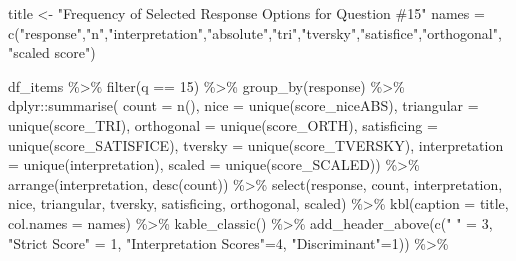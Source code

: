 \documentclass[
  letterpaper,
  DIV=11,
  numbers=noendperiod]{scrreprt}
\newenvironment{Shaded}{\begin{snugshade}}{\end{snugshade}}
\newcommand{\AttributeTok}[1]{\textcolor[rgb]{0.40,0.45,0.13}{#1}}
\newcommand{\DecValTok}[1]{\textcolor[rgb]{0.68,0.00,0.00}{#1}}
\newcommand{\FunctionTok}[1]{\textcolor[rgb]{0.28,0.35,0.67}{#1}}
\newcommand{\NormalTok}[1]{\textcolor[rgb]{0.00,0.23,0.31}{#1}}
\newcommand{\OtherTok}[1]{\textcolor[rgb]{0.00,0.23,0.31}{#1}}
\newcommand{\SpecialCharTok}[1]{\textcolor[rgb]{0.37,0.37,0.37}{#1}}
\newcommand{\StringTok}[1]{\textcolor[rgb]{0.13,0.47,0.30}{#1}}
\begin{document}
\begin{Shaded}
\begin{Highlighting}[]
\NormalTok{title }\OtherTok{\textless{}{-}} \StringTok{"Frequency of Selected Response Options for Question \#15"}
\NormalTok{names }\OtherTok{=} \FunctionTok{c}\NormalTok{(}\StringTok{"response"}\NormalTok{,}\StringTok{"n"}\NormalTok{,}\StringTok{"interpretation"}\NormalTok{,}\StringTok{"absolute"}\NormalTok{,}\StringTok{"tri"}\NormalTok{,}\StringTok{"tversky"}\NormalTok{,}\StringTok{"satisfice"}\NormalTok{,}\StringTok{"orthogonal"}\NormalTok{, }\StringTok{"scaled score"}\NormalTok{)}

\NormalTok{df\_items }\SpecialCharTok{\%\textgreater{}\%} \FunctionTok{filter}\NormalTok{(q }\SpecialCharTok{==} \DecValTok{15}\NormalTok{) }\SpecialCharTok{\%\textgreater{}\%} \FunctionTok{group\_by}\NormalTok{(response) }\SpecialCharTok{\%\textgreater{}\%}
\NormalTok{  dplyr}\SpecialCharTok{::}\FunctionTok{summarise}\NormalTok{( }\AttributeTok{count =} \FunctionTok{n}\NormalTok{(),}
                    \AttributeTok{nice =} \FunctionTok{unique}\NormalTok{(score\_niceABS),}
                    \AttributeTok{triangular =} \FunctionTok{unique}\NormalTok{(score\_TRI),}
                    \AttributeTok{orthogonal =}  \FunctionTok{unique}\NormalTok{(score\_ORTH),}
                    \AttributeTok{satisficing =}  \FunctionTok{unique}\NormalTok{(score\_SATISFICE),}
                    \AttributeTok{tversky =} \FunctionTok{unique}\NormalTok{(score\_TVERSKY),}
                    \AttributeTok{interpretation =} \FunctionTok{unique}\NormalTok{(interpretation),}
                    \AttributeTok{scaled =} \FunctionTok{unique}\NormalTok{(score\_SCALED)) }\SpecialCharTok{\%\textgreater{}\%}
  \FunctionTok{arrange}\NormalTok{(interpretation, }\FunctionTok{desc}\NormalTok{(count)) }\SpecialCharTok{\%\textgreater{}\%}
  \FunctionTok{select}\NormalTok{(response, count, interpretation, nice,}
\NormalTok{         triangular, tversky, satisficing, orthogonal, scaled) }\SpecialCharTok{\%\textgreater{}\%}
  \FunctionTok{kbl}\NormalTok{(}\AttributeTok{caption =}\NormalTok{ title, }\AttributeTok{col.names =}\NormalTok{ names) }\SpecialCharTok{\%\textgreater{}\%}  \FunctionTok{kable\_classic}\NormalTok{() }\SpecialCharTok{\%\textgreater{}\%}
  \FunctionTok{add\_header\_above}\NormalTok{(}\FunctionTok{c}\NormalTok{(}\StringTok{" "} \OtherTok{=} \DecValTok{3}\NormalTok{, }\StringTok{"Strict Score"} \OtherTok{=} \DecValTok{1}\NormalTok{, }\StringTok{"Interpretation Scores"}\OtherTok{=}\DecValTok{4}\NormalTok{, }\StringTok{"Discriminant"}\OtherTok{=}\DecValTok{1}\NormalTok{)) }\SpecialCharTok{\%\textgreater{}\%}

\end{Highlighting}
\end{Shaded}
\end{document}
